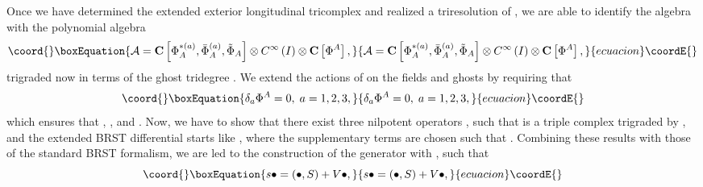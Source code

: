 \documentclass[a4paper,12pt]{article}
\begin{document}
Once we have determined the extended exterior longitudinal tricomplex and
realized a triresolution of \coordHE{}, we are able
to identify the algebra \coordHE{} with the polynomial algebra 
\begin{equation}\coord{}\boxEquation{
\mathcal{A}=\mathbf{C}\left[ \Phi _{A}^{*(a)},\bar{\Phi}_{A}^{(a)},\tilde{
\Phi}_{A}\right] \otimes C^{\infty }\left( I\right) \otimes \mathbf{C}\left[
\Phi ^{A}\right] ,  \label{sp3.66}
}{
\mathcal{A}=\mathbf{C}\left[ \Phi _{A}^{*(a)},\bar{\Phi}_{A}^{(a)},\tilde{
\Phi}_{A}\right] \otimes C^{\infty }\left( I\right) \otimes \mathbf{C}\left[
\Phi ^{A}\right] ,  }{ecuacion}\coordE{}\end{equation}
trigraded now in terms of the ghost tridegree \coordHE{}. We extend the actions of \coordHE{} on the fields and ghosts by requiring that 
\begin{equation}\coord{}\boxEquation{
\delta _{a}\Phi ^{A}=0,\;a=1,2,3,  \label{sp3.66a}
}{
\delta _{a}\Phi ^{A}=0,\;a=1,2,3,  }{ecuacion}\coordE{}\end{equation}
which ensures that \coordHE{}, \coordHE{}, \coordHE{} and \coordHE{}. Now, we have to show that there exist three
nilpotent operators \coordHE{}, such that \coordHE{} is a triple complex trigraded
by \coordHE{}, and the extended BRST differential \coordHE{}
starts like \coordHE{}, where the supplementary terms are chosen
such that \coordHE{}. Combining these results with those of the standard BRST
formalism, we are led to the construction of the generator \coordHE{} with \coordHE{}, such that 
\begin{equation}\coord{}\boxEquation{
s\bullet =\left( \bullet ,S\right) +V\bullet ,  \label{sp3.67}
}{
s\bullet =\left( \bullet ,S\right) +V\bullet ,  }{ecuacion}\coordE{}\end{equation}
\end{document}
